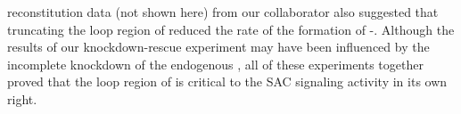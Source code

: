  reconstitution data (not shown here) from our collaborator also suggested that truncating the loop region of  reduced the rate of the formation of -. Although the results of our knockdown-rescue experiment may have been influenced by the incomplete knockdown of the endogenous , all of these experiments together proved that the loop region of  is critical to the SAC signaling activity in its own right.